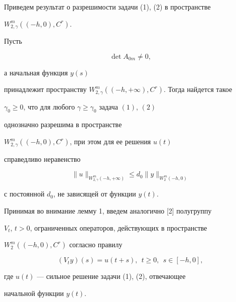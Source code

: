 Приведем результат о разрешимости задачи (1), (2) в пространстве


$W_{2,\gamma}^m((-h,0),C^r)$.





\begin{lem}


Пусть


\begin{equation}


\det A_{0m}\ne0,


\end{equation}


а начальная функция $y(s)$


принадлежит пространству $W_{2,\gamma}^m((-h,+\infty),C^r)$. Тогда найдется такое


$\gamma_0\ge0$, что для любого $\gamma\ge\gamma_0$ задача $(1)$, $(2)$


однозначно разрешима в пространстве


$W_{2,\gamma}^m((-h,0),C^r)$, при этом для ее решения $u(t)$


справедливо неравенство


$$


\|u\|_{W_{2,\gamma}^m(-h,+\infty)}\le d_0\|y\|_{W_2^m(-h,0)}


$$


с постоянной $d_0$, не зависящей от функции $y(t)$.


\end{lem}





Принимая во внимание лемму 1, введем аналогично [2] полугруппу


$V_t$, $t>0$, ограниченных операторов, действующих в пространстве


$W_2^m((-h,0),C^r)$ согласно правилу


$$


(V_ty)(s)=u(t+s),\ \ t\ge 0,\ \ s\in[-h,0],


$$


где $u(t)$ --- сильное решение задачи (1), (2), отвечающее


начальной функции $y(t)$.





